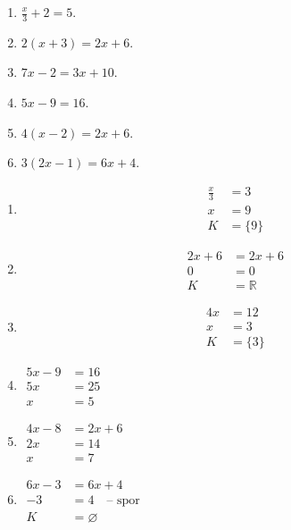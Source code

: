 \documentclass[11pt,a4paper]{article}
\begin{document}
\begin{zadaniReseniBox}[title={Domácí úkol}]
\begin{enumerate}[label=\alph*)]
\item
$\frac{x}{3}+2=5$.
\item
$2(x+3)=2x+6$.
\item
$7x-2=3x+10$.
\item
$5x-9=16$.
\item
$4(x-2)=2x+6$.
\item
$3(2x-1)=6x+4$.
\end{enumerate}
\tcblower
\begin{enumerate}[label=\alph*)]
\item
\begin{align*}
\frac{x}{3} &=3 \\
 x &=9 \\
 K&=\{9\}
\end{align*}
\item
\begin{align*}
2x+6 &=2x+6 \\
 0 &=0 \\
 K&=\mathbb R
\end{align*}
\item
\begin{align*}
4x &=12 \\
 x &=3 \\
 K&=\{3\}
\end{align*}
\item
$\begin{aligned}
5x-9&=16\\5x&=25\\x&=5
\end{aligned}$
\item
$\begin{aligned}
4x-8&=2x+6\\2x&=14\\x&=7
\end{aligned}$
\item
$\begin{aligned}
6x-3&=6x+4\\-3&=4\quad\text{-- spor}\\K&=\varnothing
\end{aligned}$
\end{enumerate}
\end{zadaniReseniBox}
\end{document}
